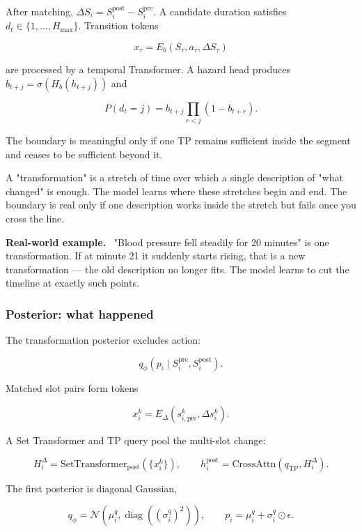 \documentclass[11pt]{article}
\newenvironment{plainword}{%
  \par\medskip\noindent\begin{minipage}{\textwidth}%
  \color{gray!75!black}\small\itshape
}{%
  \end{minipage}\par\medskip}
\newenvironment{example}{%
  \par\smallskip\noindent\begin{minipage}{\textwidth}%
  \color{teal!60!black}\small
  \textbf{\color{teal!70!black}Real-world example.}\
}{%
  \end{minipage}\par\smallskip}
\begin{document}
After matching, $\Delta S_i=S_i^{\mathrm{post}}-S_i^{\mathrm{pre}}$. A candidate duration satisfies $d_t\in\{1,\ldots,H_{\max}\}$.
Transition tokens

\[
x_\tau=E_b(S_\tau,a_\tau,\Delta S_\tau)
\]

are processed by a temporal Transformer. A hazard head produces $b_{t+j}=\sigma(H_b(h_{t+j}))$ and

\[
\boxed{P(d_t=j)=b_{t+j}\prod_{r<j}(1-b_{t+r}).}
\]

The boundary is meaningful only if one TP remains sufficient inside the segment and ceases to be sufficient beyond it.

\begin{plainword}
A "transformation" is a stretch of time over which a single description of "what changed" is enough. The model learns where these
stretches begin and end. The boundary is real only if one description works inside the stretch but fails once you cross the line.
\end{plainword}

\begin{example}
"Blood pressure fell steadily for 20 minutes" is one transformation. If at minute 21 it suddenly starts rising, that is a new
transformation --- the old description no longer fits. The model learns to cut the timeline at exactly such points.
\end{example}

\subsubsection*{Posterior: what happened}

The transformation posterior excludes action:

\[
\boxed{q_\phi(p_i\mid S_i^{\mathrm{pre}},S_i^{\mathrm{post}}).}
\]

Matched slot pairs form tokens

\[
x_i^k=E_\Delta(s_{i,\mathrm{pre}}^k,\Delta s_i^k).
\]

A Set Transformer and TP query pool the multi-slot change:

\[
H_i^\Delta=\mathrm{SetTransformer}_{\mathrm{post}}(\{x_i^k\}),
\qquad
h_i^{\mathrm{post}}=\mathrm{CrossAttn}(q_{\mathrm{TP}},H_i^\Delta).
\]

The first posterior is diagonal Gaussian,

\[
q_\phi=\mathcal N(\mu_i^q,\operatorname{diag}((\sigma_i^q)^2)),
\qquad
p_i=\mu_i^q+\sigma_i^q\odot\epsilon.
\]
\end{document}
